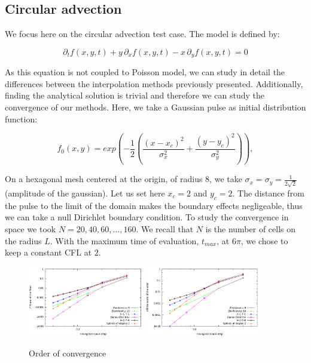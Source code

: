 \documentclass[proc]{edpsmath}
\begin{document}
\subsection{Circular advection}

We focus here on the circular advection test case. The model is defined by:

	\begin{equation}
		\partial_t f(x,y,t) + y\,\partial_x f(x,y,t) - x \,\partial_y f(x,y,t) = 0 
	\end{equation}

As this equation is not coupled to Poisson model, we can study in detail the differences between the interpolation methods previously presented.	Additionally, finding the analytical solution is trivial and therefore we can study the convergence of our methods. Here, we take a Gaussian pulse as initial distribution function:

	\begin{equation}
	 f_0(x,y) = exp  \left( -\dfrac{1}{2} \left( \dfrac{(x - x_c)^2}{\sigma_x^2} + \dfrac{(y - y_c)^2}{\sigma_y^2  } \right)   \right ), 
	\end{equation}

On a hexagonal mesh centered at the origin, of radius $8$,  we take  $\sigma_x = \sigma_y = \frac{1}{2\sqrt{2}}$ (amplitude of the gaussian). Let us set here $x_c = 2$ and $y_c = 2$. The distance from the pulse to the limit of the domain makes the boundary effects negligeable, thus we can take a null Dirichlet boundary condition.  To study the convergence in space we took $N = 20, 40, 60, ..., 160$. We recall that $N$ is the number of cells on the radius $L$. With the maximum time of evaluation, $t_{max}$, at $6 \pi$, we chose to keep a constant CFL at $2$.



\begin{figure}[h!]
	\label{fig:circ_convergence}
	\includegraphics[width=0.45\textwidth]{figures/l2.png}
	\includegraphics[width=0.45\textwidth]{figures/inf_l.png}
	\caption{Order of convergence}
\end{figure}
\end{document}

